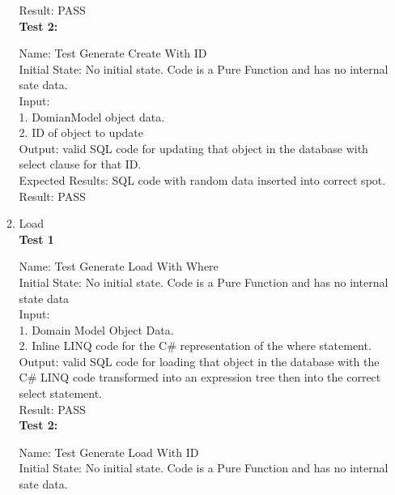 \documentclass[12pt, titlepage]{article}
\begin{document}
\begin{enumerate}
\begin{enumerate}
				Result: PASS\\

				{\bf Test 2:\\}

				Name: Test Generate Create With ID\\

				Initial State: No initial state. Code is a Pure Function and has no internal sate data.\\

				Input:\\
				1. DomianModel object data.\\
				2. ID of object to update\\

				Output: valid SQL code for updating that object in the database with
				select clause for that ID.\\

				Expected Results: SQL code with random data inserted into correct spot.\\

				Result: PASS\\

				\item Load\\

				{\bf Test 1\\}

				Name: Test Generate Load With Where\\

				Initial State: No initial state. Code is a Pure Function and has no internal state data\\

				Input:\\
				1. Domain Model Object Data.\\
				2. Inline LINQ code for the C\# representation of the where statement.\\

				Output: valid SQL code for loading that object in the database
				with the C\# LINQ code transformed into an expression tree then into the
				correct select statement.\\

				Result: PASS\\

				{\bf Test 2:\\}

				Name: Test Generate Load With ID\\

				Initial State: No initial state. Code is a Pure Function and has no internal sate data.\\


\end{enumerate}
\end{enumerate}
\end{document}

